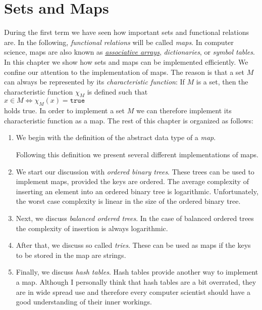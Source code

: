 \chapter{Sets and Maps}
During the first term we have seen how important sets and functional relations are.  In the
following, \emph{functional relations} will be called \emph{maps}.  In computer science, maps are also
known as \href{https://en.wikipedia.org/wiki/Associative_array}{\emph{associative arrays}}, 
\emph{dictionaries}, or \emph{symbol tables}.
In this chapter we show how sets and
maps can be implemented efficiently.  We confine our attention to the implementation of maps.  The
reason is that a set $M$ can always be represented by its \emph{characteristic function}:  If $M$ is
a set, then the characteristic function $\chi_M$ is defined such that
\\[0.2cm]
\hspace*{1.3cm}
$x \in M \Leftrightarrow \chi_M(x) = \mathtt{true}$
\\[0.2cm]
holds true.  In order to implement a set $M$ we can therefore implement its characteristic function
as a map.  The rest of this chapter is organized as follows:
\begin{enumerate}
\item We begin with the definition of the abstract data type of a \emph{map}.
    
      Following this definition we present several different implementations of maps. 
\item We start our discussion with \emph{ordered binary trees}.  These trees can be used to implement maps,
      provided the keys are ordered.        The average complexity of inserting
      an element into an ordered binary tree is logarithmic.  Unfortunately, the worst case complexity
      is linear in the size of the ordered binary tree.
\item Next, we discuss \emph{balanced ordered trees}.  In the case of balanced ordered trees the
      complexity of insertion is always logarithmic.
\item After that, we discuss so called \emph{tries}.  These can be used as maps if the keys to be
      stored in the map are strings.
\item Finally, we discuss \textsl{hash tables}.  Hash tables provide another way to implement a map.
      Although I personally think that hash tables are a bit overrated, they are in wide spread use
      and therefore every computer scientist should have a good understanding of their inner workings.
\end{enumerate}

